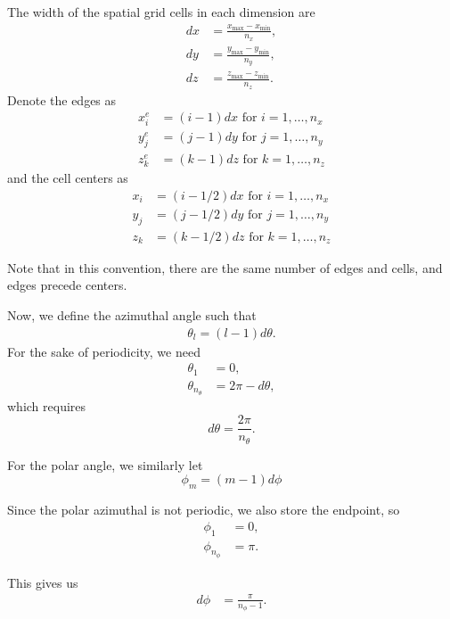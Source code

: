 \documentclass[ms,cpyr,lof,lot]{uathesis}
\begin{document}
The width of the spatial grid cells in each dimension are
\begin{align*}
  dx &= \frac{x_{\max}-x_{\min}}{n_x}, \\ 
  dy &= \frac{y_{\max}-y_{\min}}{n_y}, \\ 
  dz &= \frac{z_{\max}-z_{\min}}{n_z}.
\end{align*}
Denote the edges as 
\begin{align*}
  x_i^e &= (i-1)dx \mbox{ for } i=1,\ldots,n_x \\
  y_j^e &= (j-1)dy \mbox{ for } j=1,\ldots,n_y \\
  z_k^e &= (k-1)dz \mbox{ for } k=1,\ldots,n_z 
\end{align*}
and the cell centers as
\begin{align*}
  x_i &= (i-1/2)dx \mbox{ for } i=1,\ldots,n_x \\
  y_j &= (j-1/2)dy \mbox{ for } j=1,\ldots,n_y \\
  z_k &= (k-1/2)dz \mbox{ for } k=1,\ldots,n_z
\end{align*}


Note that in this convention, there are the same number of edges and cells,
and edges precede centers.

Now, we define the azimuthal angle such that
\begin{align*}
  \theta_l = (l-1)d\theta.
\end{align*}
For the sake of periodicity, we need
\begin{align*}
  \theta_1 &= 0, \\
  \theta_{n_\theta} &= 2\pi-d\theta,
\end{align*}
which requires
\begin{equation*}
  d\theta = \frac{2\pi}{n_\theta}.
\end{equation*}

For the polar angle, we similarly let
\begin{equation*}
  \phi_m = (m-1)d\phi
\end{equation*}

Since the polar azimuthal is not periodic, we also store the endpoint, so
\begin{align*}
  \phi_1 &= 0, \\
  \phi_{n_\phi} &= \pi.
\end{align*}

This gives us
\begin{align*}
  d\phi &= \frac{\pi}{n_\phi-1}.
\end{align*}
\end{document}
